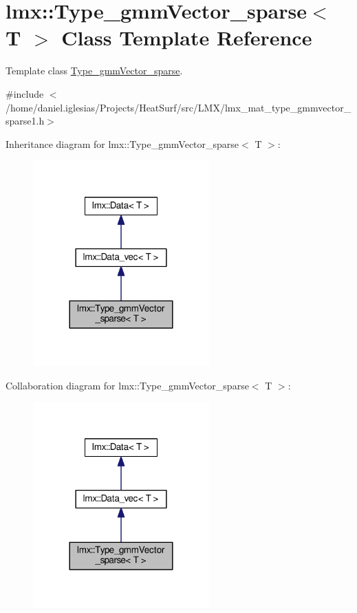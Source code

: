 \hypertarget{classlmx_1_1Type__gmmVector__sparse}{\section{lmx\-:\-:Type\-\_\-gmm\-Vector\-\_\-sparse$<$ T $>$ Class Template Reference}
\label{classlmx_1_1Type__gmmVector__sparse}
}


Template class \hyperlink{classlmx_1_1Type__gmmVector__sparse}{Type\-\_\-gmm\-Vector\-\_\-sparse}.  




{\ttfamily \#include $<$/home/daniel.\-iglesias/\-Projects/\-Heat\-Surf/src/\-L\-M\-X/lmx\-\_\-mat\-\_\-type\-\_\-gmmvector\-\_\-sparse1.\-h$>$}



Inheritance diagram for lmx\-:\-:Type\-\_\-gmm\-Vector\-\_\-sparse$<$ T $>$\-:
\nopagebreak
\begin{figure}[H]
\begin{center}
\leavevmode
\includegraphics[width=192pt]{classlmx_1_1Type__gmmVector__sparse__inherit__graph}
\end{center}
\end{figure}


Collaboration diagram for lmx\-:\-:Type\-\_\-gmm\-Vector\-\_\-sparse$<$ T $>$\-:
\nopagebreak
\begin{figure}[H]
\begin{center}
\leavevmode
\includegraphics[width=192pt]{classlmx_1_1Type__gmmVector__sparse__coll__graph}
\end{center}
\end{figure}
